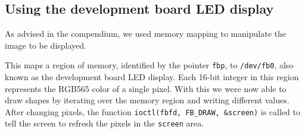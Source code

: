 \subsection{Using the development board LED display}
As advised in the compendium, we used memory mapping to manipulate the image to be displayed.



This maps a region of memory, identified by the pointer \texttt{fbp}, to \texttt{/dev/fb0}, also known as the development board LED display.
Each 16-bit integer in this region represents the RGB565 color of a single pixel.
With this we were now able to draw shapes by iterating over the memory region and writing different values.
After changing pixels, the function \texttt{ioctl(fbfd, FB\_DRAW, &screen)} is called to tell the screen to refresh the pixels in the \texttt{screen} area.

